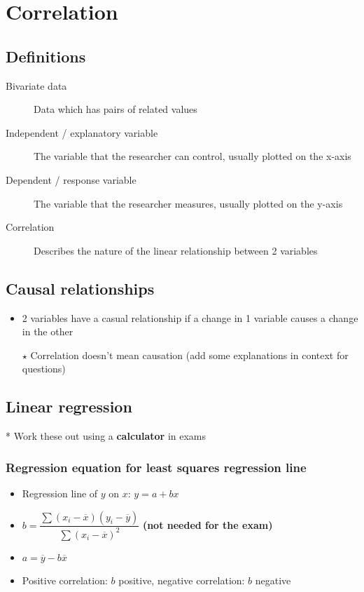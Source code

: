 \documentclass[oneside,fleqn,11pt]{book}
\begin{document}
	
	
	\pagebreak
	
	
	\chapter{Correlation}
	\section{Definitions}
	\begin{description}
		\item[Bivariate data] Data which has pairs of related values
		\item[Independent / explanatory variable] The variable that the researcher can control, usually plotted on the x-axis
		\item[Dependent / response variable] The variable that the researcher measures, usually plotted on the y-axis
		\item[Correlation] Describes the nature of the linear relationship between 2 variables
	\end{description}
	
	\section{Causal relationships}
	\begin{itemize}
		\item 2 variables have a casual relationship if a change in 1 variable causes a change in the other
		\item[$\star$] Correlation doesn't mean causation (add some explanations in context for questions)
	\end{itemize}
	
	\section{Linear regression}
	* Work these out using a \textbf{calculator} in exams
	\subsection{Regression equation for least squares regression line}
	\begin{itemize}
		\item Regression line of $y$ on $x$: $y=a+bx$
		\item $b=\dfrac{\sum (x_i-\overline{x}) (y_i-\overline{y})}{\sum (x_i-\overline{x})^2}$ \textbf{(not needed for the exam)}
		\item $a=\overline{y}-b\overline{x}$
		\item Positive correlation: $b$ positive, negative correlation: $b$ negative
	\end{itemize}
	
\end{document}
